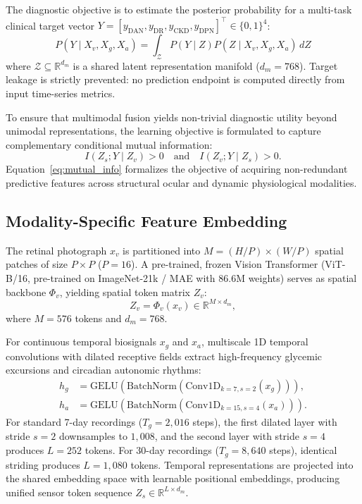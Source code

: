 \documentclass[journal,10pt,twocolumn]{IEEEtran}
\begin{document}
The diagnostic objective is to estimate the posterior probability for a multi-task clinical target vector $Y = [y_{\text{DAN}}, y_{\text{DR}}, y_{\text{CKD}}, y_{\text{DPN}}]^\top \in \{0, 1\}^4$:
\begin{equation}
    P(Y \mid X_v, X_g, X_a) = \int_{\mathcal{Z}} P(Y \mid Z) P(Z \mid X_v, X_g, X_a) \, dZ
    \label{eq:posterior}
\end{equation}
where $\mathcal{Z} \subseteq \mathbb{R}^{d_m}$ is a shared latent representation manifold ($d_m = 768$). Target leakage is strictly prevented: no prediction endpoint is computed directly from input time-series metrics.

To ensure that multimodal fusion yields non-trivial diagnostic utility beyond unimodal representations, the learning objective is formulated to capture complementary conditional mutual information:
\begin{equation}
    I(Z_s; Y \mid Z_v) > 0 \quad \text{and} \quad I(Z_v; Y \mid Z_s) > 0.
    \label{eq:mutual_info}
\end{equation}
Equation~\eqref{eq:mutual_info} formalizes the objective of acquiring non-redundant predictive features across structural ocular and dynamic physiological modalities.

\subsection{Modality-Specific Feature Embedding}
\label{sec:modality_embedding}
The retinal photograph $x_v$ is partitioned into $M = (H/P) \times (W/P)$ spatial patches of size $P \times P$ ($P=16$). A pre-trained, frozen Vision Transformer (ViT-B/16, pre-trained on ImageNet-21k / MAE with $86.6\text{M}$ weights) serves as spatial backbone $\Phi_v$, yielding spatial token matrix $Z_v$:
\begin{equation}
    Z_v = \Phi_v(x_v) \in \mathbb{R}^{M \times d_m},
    \label{eq:vit_embed}
\end{equation}
where $M = 576$ tokens and $d_m = 768$.

For continuous temporal biosignals $x_g$ and $x_a$, multiscale 1D temporal convolutions with dilated receptive fields extract high-frequency glycemic excursions and circadian autonomic rhythms:
\begin{align}
    h_g &= \text{GELU}\left(\text{BatchNorm}\left(\text{Conv1D}_{k=7, s=2}(x_g)\right)\right), \\
    h_a &= \text{GELU}\left(\text{BatchNorm}\left(\text{Conv1D}_{k=15, s=4}(x_a)\right)\right).
\end{align}
For standard 7-day recordings ($T_g = 2{,}016$ steps), the first dilated layer with stride $s=2$ downsamples to $1{,}008$, and the second layer with stride $s=4$ produces $L=252$ tokens. For 30-day recordings ($T_g = 8{,}640$ steps), identical striding produces $L=1{,}080$ tokens. Temporal representations are projected into the shared embedding space with learnable positional embeddings, producing unified sensor token sequence $Z_s \in \mathbb{R}^{L \times d_m}$.
\end{document}
